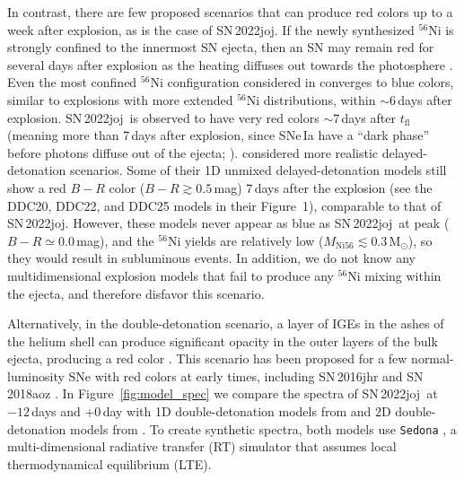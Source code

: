\documentclass[twocolumn]{aastex631}
\newcommand{\sn}{SN\,2022joj}
\begin{document}
\begin{CJK*}{UTF8}{gbsn}
In contrast, there are few proposed scenarios that can produce red colors up to a week after explosion, as is the case of \sn. If the newly synthesized $^{56}$Ni is strongly confined to the innermost SN ejecta, then an SN may remain red for several days after explosion as the heating diffuses out towards the photosphere \citep{Piro_2016}. Even the most confined $^{56}$Ni configuration considered in \citet{Piro_2016} converges to blue colors, similar to explosions with more extended $^{56}$Ni distributions, within $\sim$6\,days after explosion. \sn\ is observed to have very red colors $\sim$7\,days after $t_\mathrm{fl}$ (meaning more than 7\,days after explosion, since SNe\,Ia have a ``dark phase'' before photons diffuse out of the ejecta; \citealt{Piro_2013}). \citet{Dessart_2014} considered more realistic delayed-detonation scenarios. Some of their 1D unmixed delayed-detonation models still show a red $B-R$ color ($B-R\gtrsim0.5$\,mag) 7\,days after the explosion (see the DDC20, DDC22, and DDC25 models in their Figure~1), comparable to that of \sn. However, these models never appear as blue as \sn\ at peak ($B-R\simeq0.0$\,mag), and the $^{56}$Ni yields are relatively low ($M_\mathrm{Ni56}\lesssim0.3\,\mathrm{M_\odot}$), so they would result in subluminous events. In addition, we do not know any multidimensional explosion models that fail to produce any $^{56}$Ni mixing within the ejecta, and therefore disfavor this scenario.

Alternatively, in the double-detonation scenario, a layer of IGEs in the ashes of the helium shell can produce significant opacity in the outer layers of the bulk ejecta, producing a red color \citep{polin_observational_2019}. This scenario has been proposed for a few normal-luminosity SNe with red colors at early times, including SN\,2016jhr \citep{jiang_16jhr_2017} and SN\,2018aoz \citep{Ni_2022}. In Figure~\ref{fig:model_spec} we compare the spectra of \sn\ at $-12$\,days and $+0$\,day with 1D double-detonation models from \citet{polin_observational_2019} and 2D double-detonation models from \citet{Shen_2D_2021}. To create synthetic spectra, both models use \texttt{Sedona} \citep{Kasen_Sedona_2006}, a multi-dimensional radiative transfer (RT) simulator that assumes local thermodynamical equilibrium (LTE).


\end{CJK*}
\end{document}
